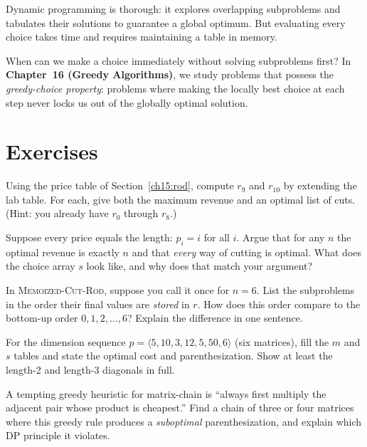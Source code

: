 Dynamic programming is thorough: it explores overlapping subproblems and tabulates their solutions to guarantee a global optimum. But evaluating every choice takes time and requires maintaining a table in memory.

When can we make a choice immediately without solving subproblems first? In \textbf{Chapter~16 (Greedy Algorithms)}, we study problems that possess the \emph{greedy-choice property}: problems where making the locally best choice at each step never locks us out of the globally optimal solution.

\section*{Exercises}

\begin{exercise}
\label{ch15:ex-rod}
Using the price table of Section~\ref{ch15:rod}, compute $r_9$ and $r_{10}$ by
extending the lab table. For each, give both the maximum revenue and an optimal
list of cuts. (Hint: you already have $r_0$ through $r_8$.)
\end{exercise}

\begin{exercise}
\label{ch15:ex-rod2}
Suppose every price equals the length: $p_i = i$ for all $i$. Argue that for any
$n$ the optimal revenue is exactly $n$ and that \emph{every} way of cutting is
optimal. What does the choice array $s$ look like, and why does that match your
argument?
\end{exercise}

\begin{exercise}
\label{ch15:ex-memo}
In \textsc{Memoized-Cut-Rod}, suppose you call it once for $n = 6$. List the
subproblems in the order their final values are \emph{stored} in $r$. How does
this order compare to the bottom-up order $0,1,2,\dots,6$? Explain the
difference in one sentence.
\end{exercise}

\begin{exercise}
\label{ch15:ex-mc}
For the dimension sequence $p = \langle 5, 10, 3, 12, 5, 50, 6\rangle$ (six
matrices), fill the $m$ and $s$ tables and state the optimal cost and
parenthesization. Show at least the length-2 and length-3 diagonals in full.
\end{exercise}

\begin{exercise}
\label{ch15:ex-greedy}
A tempting greedy heuristic for matrix-chain is ``always first multiply the
adjacent pair whose product is cheapest.'' Find a chain of three or four
matrices where this greedy rule produces a \emph{suboptimal} parenthesization,
and explain which DP principle it violates.
\end{exercise}

